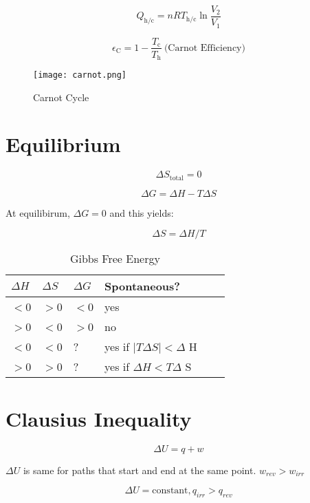 \documentclass{article}
\begin{document}
\begin{equation*}
Q_\text{h/c} = nRT_\text{h/c} \ln\frac{V_\text{2}}{V_\text{1}}
\end{equation*}

\begin{equation*}
\epsilon_{\text{C}} = 1 - \frac{T_\text{c}}{T_\text{h}} \ \text{(Carnot Efficiency)}
\end{equation*}

\begin{figure}[h]
\centering
\texttt{[image: carnot.png]}
\caption{Carnot Cycle}
\end{figure}

\section{Equilibrium}
\begin{equation*}
\Delta S_{\text{total}} = 0
\end{equation*}

\begin{equation*}
\Delta G = \Delta H - T \Delta S
\end{equation*}

At equilibirum, $\Delta G =0$ and this yields:

\[
\Delta S = \Delta H/T 
\]
\begin{table}[h!]
\centering
\caption{Gibbs Free Energy}
\label{my-label}
\def\arraystretch{1.5}
\begin{tabular}{|l|l|l|l|l|l|}
\hline
$\Delta H$ & $\Delta S$ & $\Delta G$ & Spontaneous?  \\
\hline
$<$0 & $>$0 & $<$0 & yes \\
\hline
$>$0 & $<$0 & $>$0 & no\\
\hline
$<$0 & $<$0 & ? & yes if $|T\Delta S| < \Delta$ H  \\
\hline 
$>$0 & $>$0 & ? & yes if $\Delta H < T \Delta$ S \\
\hline
\end{tabular}
\end{table}

\section{Clausius Inequality}
\[
\Delta U = q + w
\]

$\Delta U$ is same for paths that start and end at the same point. $w_{rev} > w_{irr}$

\[
\Delta U = \text{constant}, q_{irr} > q_{rev}
\]
\end{document}
